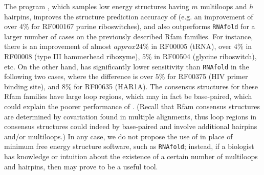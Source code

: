The program {\rnahairpinml}, which samples low energy structures having
$m$ multiloops and $h$ hairpins,  improves the structure prediction
accuracy of {\rnahairpin} (e.g. an improvement of over 4\% for RF000167
purine riboswitches), and also outperforms {\tt RNAfold} for a larger number
of cases on the previously described Rfam families. For instance,
there is an improvement
of almost $approx 24\%$ in RF00005 (tRNA),
over $4\%$ in RF00008 (type III hammerhead ribozyme),
$5\%$ in RF00504  (glycine riboswitch), etc.
On the other hand, {\rnahairpinml} has significantly lower
sensitivity than {\tt RNAfold} in the following two cases, where
the difference is over $5\%$ for RF00375 (HIV primer binding site),
and $8\%$ for RF00635 (HAR1A). The consensus structures for these
Rfam families have large loop regions, which may in fact be base-paired,
which could explain the poorer performance of {\rnahairpinml}.
(Recall that Rfam consensus structures are determined by covariation found
in multiple alignments, thus loop regions in consensus structures could
indeed by base-paired and involve additional hairpins and/or multiloops.)
In any case, we do not propose the use of {\rnahairpinml} in place of
minimum free energy structure software, such as {\tt RNAfold}; instead,
if a biologist has knowledge or intuition about the existence of a certain
number of multiloops and hairpins, then {\rnahairpinml} may prove to be a
useful tool.

